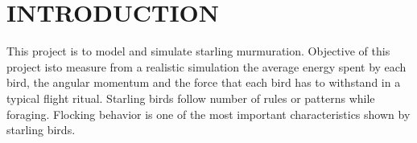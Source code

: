 \hypertarget{index_intro_sec}{}\section{I\+N\+T\+R\+O\+D\+U\+C\+T\+I\+ON}\label{index_intro_sec}
This project is to model and simulate starling murmuration. Objective of this project isto measure from a realistic simulation the average energy spent by each bird, the angular momentum and the force that each bird has to withstand in a typical flight ritual. Starling birds follow number of rules or patterns while foraging. Flocking behavior is one of the most important characteristics shown by starling birds. 